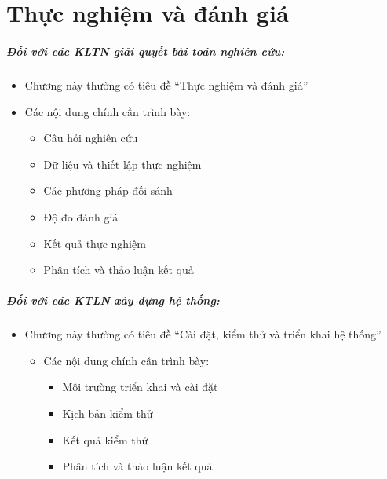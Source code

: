 \chapter{Thực nghiệm và đánh giá}
\label{chap:experiment}
\paragraph{Đối với các KLTN giải quyết bài toán nghiên cứu:}

\begin{itemize}
    \item Chương này thường có tiêu đề ``Thực nghiệm và đánh giá''
    \item Các nội dung chính cần trình bày:
    \begin{itemize}
        \item Câu hỏi nghiên cứu
        \item Dữ liệu và thiết lập thực nghiệm
        \item Các phương pháp đối sánh
        \item Độ đo đánh giá
        \item Kết quả thực nghiệm
        \item Phân tích và thảo luận kết quả
    \end{itemize}
\end{itemize}


\paragraph{Đối với các KTLN xây dựng hệ thống:}

\begin{itemize}
    \item Chương này thường có tiêu đề ``Cài đặt, kiểm thử và triển khai hệ thống''
    \begin{itemize}
        \item Các nội dung chính cần trình bày:
        \begin{itemize}
            \item Môi trường triển khai và cài đặt
            \item Kịch bản kiểm thử
            \item Kết quả kiểm thử
            \item Phân tích và thảo luận kết quả
        \end{itemize}
    \end{itemize}
\end{itemize}
